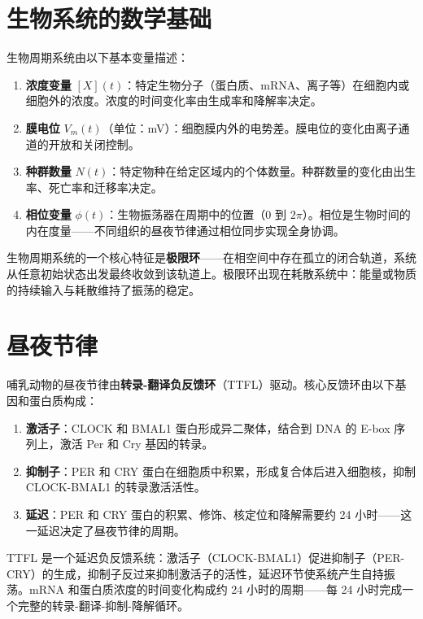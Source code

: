 \section{生物系统的数学基础}

\begin{definition}[生物周期系统的基本量]\label{def:biological_quantities}
生物周期系统由以下基本变量描述：
\begin{enumerate}[label=(\roman*)]
    \item \textbf{浓度变量} $[X](t)$：特定生物分子（蛋白质、mRNA、离子等）在细胞内或细胞外的浓度。浓度的时间变化率由生成率和降解率决定。
    \item \textbf{膜电位} $V_m(t)$（单位：mV）：细胞膜内外的电势差。膜电位的变化由离子通道的开放和关闭控制。
    \item \textbf{种群数量} $N(t)$：特定物种在给定区域内的个体数量。种群数量的变化由出生率、死亡率和迁移率决定。
    \item \textbf{相位变量} $\phi(t)$：生物振荡器在周期中的位置（$0$ 到 $2\pi$）。相位是生物时间的内在度量——不同组织的昼夜节律通过相位同步实现全身协调。
\end{enumerate}
生物周期系统的一个核心特征是\textbf{极限环}——在相空间中存在孤立的闭合轨道，系统从任意初始状态出发最终收敛到该轨道上。极限环出现在耗散系统中：能量或物质的持续输入与耗散维持了振荡的稳定。
\end{definition}

\section{昼夜节律}

\begin{definition}[昼夜节律的分子机制]\label{def:circadian_rhythm}
哺乳动物的昼夜节律由\textbf{转录-翻译负反馈环}（TTFL）驱动。核心反馈环由以下基因和蛋白质构成：
\begin{enumerate}[label=(\roman*)]
    \item \textbf{激活子}：CLOCK 和 BMAL1 蛋白形成异二聚体，结合到 DNA 的 E-box 序列上，激活 Per 和 Cry 基因的转录。
    \item \textbf{抑制子}：PER 和 CRY 蛋白在细胞质中积累，形成复合体后进入细胞核，抑制 CLOCK-BMAL1 的转录激活活性。
    \item \textbf{延迟}：PER 和 CRY 蛋白的积累、修饰、核定位和降解需要约 24 小时——这一延迟决定了昼夜节律的周期。
\end{enumerate}
TTFL 是一个延迟负反馈系统：激活子（CLOCK-BMAL1）促进抑制子（PER-CRY）的生成，抑制子反过来抑制激活子的活性，延迟环节使系统产生自持振荡。mRNA 和蛋白质浓度的时间变化构成约 24 小时的周期——每 24 小时完成一个完整的转录-翻译-抑制-降解循环。
\end{definition}

